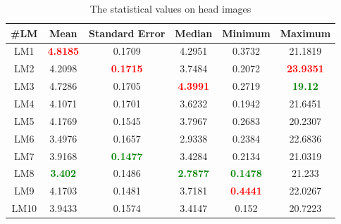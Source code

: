 \documentclass[review]{elsarticle}
\begin{document}
\begin{table}[htbp]
\begin{tabular}{ | c | c | c | c | c | c | }
\hline
	\textbf{\#LM} & \textbf{Mean} & \textbf{Standard Error} & \textbf{Median} & \textbf{Minimum} & \textbf{Maximum} \\ \hline
	LM1 & \textcolor{red}{\textbf{4.8185}} & 0.1709 & 4.2951 & 0.3732 & 21.1819 \\ \hline
	LM2 & 4.2098 & \textcolor{red}{\textbf{0.1715}} & 3.7484 & 0.2072 & \textcolor{red}{\textbf{23.9351}} \\ \hline
	LM3 & 4.7286 & 0.1705 & \textcolor{red}{\textbf{4.3991}} & 0.2719 & \textcolor{green}{\textbf{19.12}} \\ \hline
	LM4 & 4.1071 & 0.1701 & 3.6232 & 0.1942 & 21.6451 \\ \hline
	LM5 & 4.1769 & 0.1545 & 3.7967 & 0.2683 & 20.2307 \\ \hline
	LM6 & 3.4976 & 0.1657 & 2.9338 & 0.2384 & 22.6836 \\ \hline
	LM7 & 3.9168 & \textcolor{green}{\textbf{0.1477}} & 3.4284 & 0.2134 & 21.0319 \\ \hline
	LM8 & \textcolor{green}{\textbf{3.402}} & 0.1486 & \textcolor{green}{\textbf{2.7877}} & \textcolor{green}{\textbf{0.1478}} & 21.233 \\ \hline
	LM9 & 4.1703 & 0.1481 & 3.7181 & \textcolor{red}{\textbf{0.4441}} & 22.0267 \\ \hline
	LM10 & 3.9433 & 0.1574 & 3.4147 & 0.152 & 20.7223 \\ \hline
\end{tabular}
\caption{The statistical values on head images}
\label{a2}
\end{table}
\end{document}
